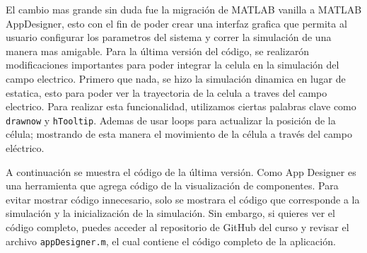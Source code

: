 \tab El cambio mas grande sin duda fue la migración de MATLAB vanilla a MATLAB AppDesigner, esto con el fin de poder crear una interfaz grafica que permita al usuario configurar los parametros del sistema y correr la simulación de una manera mas amigable. Para la última versión del código, se realizarón modificaciones importantes para poder integrar la celula en la simulación del campo electrico. Primero que nada, se hizo la simulación dinamica en lugar de estatica, esto para poder ver la trayectoria de la celula a traves del campo electrico. Para realizar esta funcionalidad, utilizamos ciertas palabras clave como \texttt{\textbar drawnow\textbar} y \texttt{\textbar hTooltip\textbar}. Ademas de usar loops para actualizar la posición de la célula; mostrando de esta manera el movimiento de la célula a través del campo eléctrico.

\tab A continuación se muestra el código de la última versión. Como App Designer es una herramienta que agrega código de la visualización de componentes. Para evitar mostrar código innecesario, solo se mostrara el código que corresponde a la simulación y la inicialización de la simulación. Sin embargo, si quieres ver el código completo, puedes acceder al repositorio de GitHub del curso y revisar el archivo \texttt{appDesigner.m}, el cual contiene el código completo de la aplicación.

